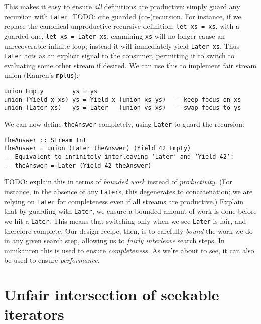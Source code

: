 \documentclass[acmsmall,screen,review,anonymous,dvipsnames,svgnames]{acmart}
\newcommand\hask[1]{\texttt{#1}}
\newcommand\ttt\texttt
\newcommand\todo[1]{{\color{Orange}#1}}
\renewcommand\todo[1]{{\color{IndianRed}#1}}
\begin{document}
\noindent
This makes it easy to ensure \emph{all} definitions are productive: simply guard any recursion with \hask{Later}.
\todo{TODO: cite guarded (co-)recursion.}
For instance, if we replace the canonical unproductive recursive definition, \hask{let xs = xs}, with a guarded one, \hask{let xs = Later xs}, examining \ttt{xs} will no longer cause an unrecoverable infinite loop; instead it will immediately yield \hask{Later xs}.
Thus \hask{Later} acts as an explicit signal to the consumer, permitting it to switch to evaluating some other stream if desired.
We can use this to implement fair stream union (\textmu{}Kanren's \ttt{mplus}):


\begin{verbatim}
union Empty        ys = ys
union (Yield x xs) ys = Yield x (union xs ys)  -- keep focus on xs
union (Later xs)   ys = Later   (union ys xs)  -- swap focus to ys
\end{verbatim}

\noindent
We can now define \ttt{theAnswer} completely, using \hask{Later} to guard the recursion:

\begin{verbatim}
theAnswer :: Stream Int
theAnswer = union (Later theAnswer) (Yield 42 Empty)
-- Equivalent to infinitely interleaving ‘Later’ and ‘Yield 42’:
-- theAnswer = Later (Yield 42 theAnswer)
\end{verbatim}

\noindent
\todo{%
  TODO: explain this in terms of \emph{bounded work} instead of \emph{productivity}.
  (For instance, in the absence of any \hask{Later}s, this degenerates to concatenation; we are relying on \hask{Later} for completeness even if all streams are productive.)
  Explain that by guarding with \hask{Later}, we ensure a bounded amount of work is done before we hit a \hask{Later}.
  This means that switching only when we see \hask{Later} is fair, and therefore complete.
  Our design recipe, then, is to carefully \emph{bound} the work we do in any given search step, allowing us to \emph{fairly interleave} search steps.
  In minikanren this is used to ensure \emph{completeness.}
  As we're about to see, it can also be used to ensure \emph{performance.}
}



\section{Unfair intersection of seekable iterators}
\end{document}
